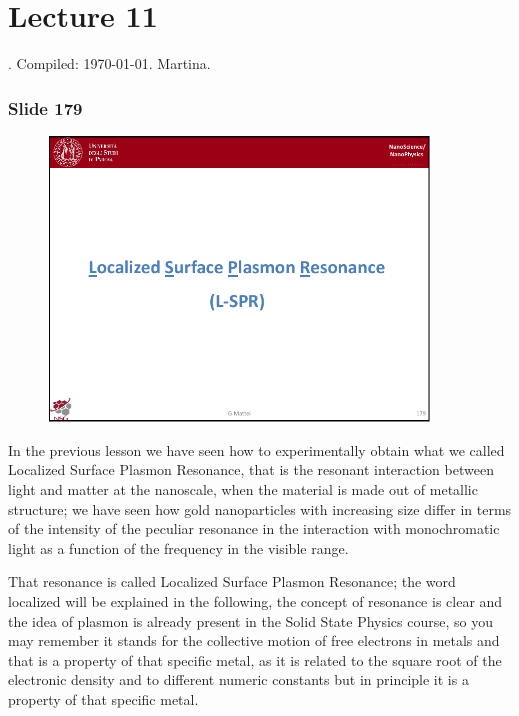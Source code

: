 \documentclass[../main/main.tex]{subfiles}
\begin{document}
\section{Lecture 11}
 . Compiled:  \today. Martina.

\subsubsection{Slide 179}

\begin{figure}[h!]
\centering
\includegraphics[page=1,width=0.9\textwidth]{../lessons/pdf_file/11_lesson.pdf}
\end{figure}


In the previous lesson we have seen how to experimentally obtain what we called Localized Surface Plasmon Resonance, that is the resonant interaction  between light and matter at the nanoscale, when the material is made out of metallic structure; we have seen how gold nanoparticles with increasing size differ in terms of the intensity of the peculiar resonance in the interaction with monochromatic light as a function of the frequency in the visible range. 

That resonance is called Localized Surface Plasmon Resonance; the word localized will be explained in the following, the concept of resonance is clear and the idea of plasmon is already present in the Solid State Physics course, so you may remember it stands for the collective motion of free electrons in metals and that is a property of that specific metal, as it is related to the square root of the electronic density and to different numeric constants but in principle it is a property of that specific metal. 
\end{document}
